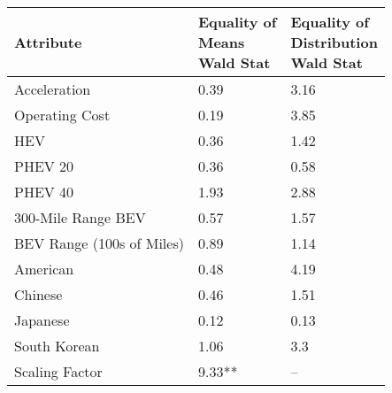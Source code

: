 \begin{tabular}{lll}
\toprule
                Attribute & \makecell{Equality of \\ Means \\ Wald Stat} & \makecell{Equality of \\ Distribution \\ Wald Stat} \\
\midrule
             Acceleration &                        \multirow{1}{*}{0.39} &                              \multirow{1}{*}{3.16} \\
           Operating Cost &                        \multirow{1}{*}{0.19} &                              \multirow{1}{*}{3.85} \\
                      HEV &                        \multirow{1}{*}{0.36} &                              \multirow{1}{*}{1.42} \\
                  PHEV 20 &                        \multirow{1}{*}{0.36} &                              \multirow{1}{*}{0.58} \\
                  PHEV 40 &                        \multirow{1}{*}{1.93} &                              \multirow{1}{*}{2.88} \\
       300-Mile Range BEV &                        \multirow{1}{*}{0.57} &                              \multirow{1}{*}{1.57} \\
BEV Range (100s of Miles) &                        \multirow{1}{*}{0.89} &                              \multirow{1}{*}{1.14} \\
                 American &                        \multirow{1}{*}{0.48} &                              \multirow{1}{*}{4.19} \\
                  Chinese &                        \multirow{1}{*}{0.46} &                              \multirow{1}{*}{1.51} \\
                 Japanese &                        \multirow{1}{*}{0.12} &                              \multirow{1}{*}{0.13} \\
             South Korean &                        \multirow{1}{*}{1.06} &                               \multirow{1}{*}{3.3} \\
           Scaling Factor &                      \multirow{1}{*}{9.33**} &                                                 -- \\
\bottomrule
\end{tabular}
